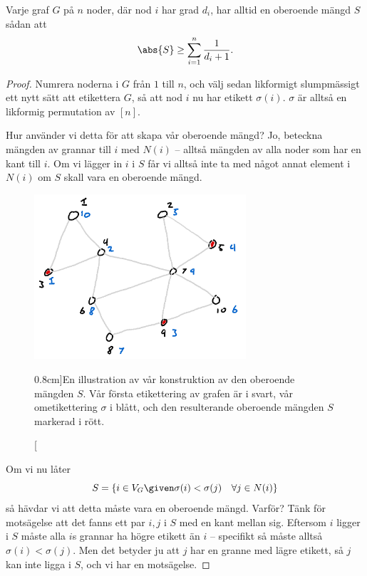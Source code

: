 \documentclass[nobib]{tufte-handout}
\begin{document}
\begin{theorem}
    Varje graf $G$ på $n$ noder, där nod $i$ har grad $d_i$, har alltid en oberoende mängd $S$ sådan att
    $$\abs{S} \geq \sum_{i=1}^{n} \frac{1}{d_i + 1}.$$

    \begin{proof}
        Numrera noderna i $G$ från $1$ till $n$, och välj sedan likformigt slumpmässigt ett nytt sätt att etikettera $G$, så att nod $i$ nu har etikett $\sigma(i)$. $\sigma$ är alltså en likformig permutation av $[n]$.

        Hur använder vi detta för att skapa vår oberoende mängd? Jo, beteckna mängden av grannar till $i$ med $N(i)$ -- alltså mängden av alla noder som har en kant till $i$. Om vi lägger in $i$ i $S$ får vi alltså inte ta med något annat element i $N(i)$ om $S$ skall vara en oberoende mängd.
        
        \begin{figure}
            \centering
            \includegraphics[width = 0.7\textwidth]{graphics/Caro_Wei_construction.png}
            \caption[][0.8cm]{En illustration av vår konstruktion av den oberoende mängden $S$. Vår första etikettering av grafen är i svart, vår ometikettering $\sigma$ i blått, och den resulterande oberoende mängden $S$ markerad i rött.}
        \end{figure}

        Om vi nu låter
        $$S = \left\{i \in V_G \given \sigma(i) < \sigma(j)\quad \forall j \in N(i)\right\}$$
        så hävdar vi att detta måste vara en oberoende mängd. Varför? Tänk för motsägelse att det fanns ett par $i, j$ i $S$ med en kant mellan sig. Eftersom $i$ ligger i $S$ måste alla $i$s grannar ha högre etikett än $i$ -- specifikt så måste alltså $\sigma(i) < \sigma(j)$. Men det betyder ju att $j$ har en granne med lägre etikett, så $j$ kan inte ligga i $S$, och vi har en motsägelse.


\end{proof}
\end{theorem}
\end{document}
